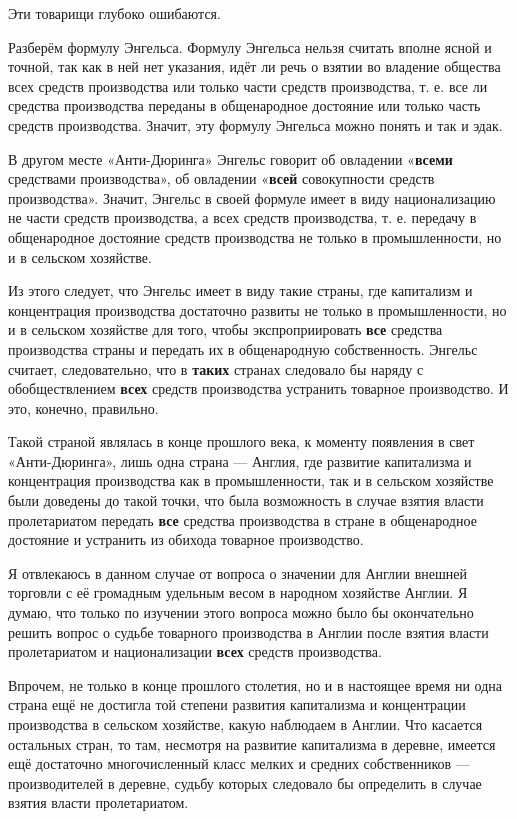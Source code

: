 \documentclass[12pt, a4paper, openany]{book}
\begin{document}
Эти товарищи глубоко ошибаются.

Разберём формулу Энгельса. Формулу Энгельса нельзя считать вполне ясной и точной, так как в ней нет указания, идёт ли речь о взятии во владение общества всех средств производства или только части средств производства, т. е. все ли средства производства переданы в общенародное достояние или только часть средств производства. Значит, эту формулу Энгельса можно понять и так и эдак.

В другом месте «Анти-Дюринга» Энгельс говорит об овладении «\textbf{всеми} средствами производства», об овладении «\textbf{всей} совокупности средств производства». Значит, Энгельс в своей формуле имеет в виду национализацию не части средств производства, а всех средств производства, т. е. передачу в общенародное достояние средств производства не только в промышленности, но и в сельском хозяйстве.

Из этого следует, что Энгельс имеет в виду такие страны, где капитализм и концентрация производства достаточно развиты не только в промышленности, но и в сельском хозяйстве для того, чтобы экспроприировать \textbf{все} средства производства страны и передать их в общенародную собственность. Энгельс считает, следовательно, что в \textbf{таких} странах следовало бы наряду с обобществлением \textbf{всех} средств производства устранить товарное производство. И это, конечно, правильно.

Такой страной являлась в конце прошлого века, к моменту появления в свет «Анти-Дюринга», лишь одна страна — Англия, где развитие капитализма и концентрация производства как в промышленности, так и в сельском хозяйстве были доведены до такой точки, что была возможность в случае взятия власти пролетариатом передать \textbf{все} средства производства в стране в общенародное достояние и устранить из обихода товарное производство.

Я отвлекаюсь в данном случае от вопроса о значении для Англии внешней торговли с её громадным удельным весом в народном хозяйстве Англии. Я думаю, что только по изучении этого вопроса можно было бы окончательно решить вопрос о судьбе товарного производства в Англии после взятия власти пролетариатом и национализации \textbf{всех} средств производства.

Впрочем, не только в конце прошлого столетия, но и в настоящее время ни одна страна ещё не достигла той степени развития капитализма и концентрации производства в сельском хозяйстве, какую наблюдаем в Англии. Что касается остальных стран, то там, несмотря на развитие капитализма в деревне, имеется ещё достаточно многочисленный класс мелких и средних собственников — производителей в деревне, судьбу которых следовало бы определить в случае взятия власти пролетариатом.
\end{document}
